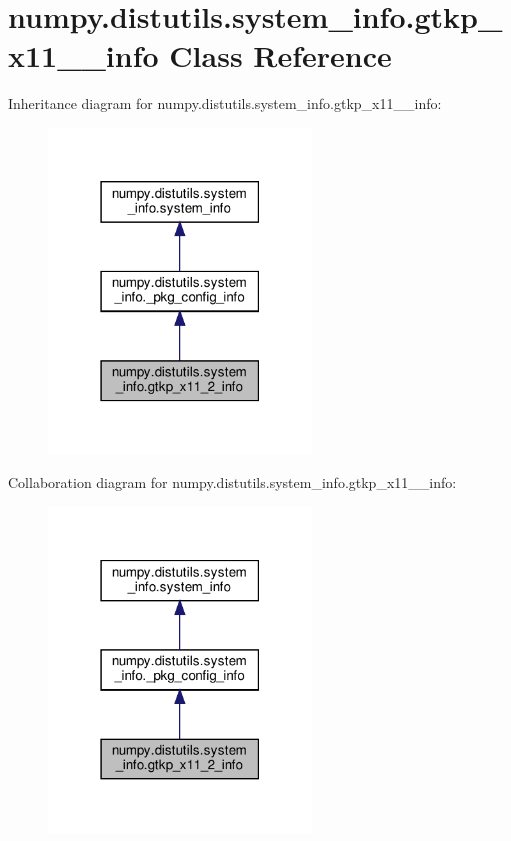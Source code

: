 \hypertarget{classnumpy_1_1distutils_1_1system__info_1_1gtkp__x11__2__info}{}\section{numpy.\+distutils.\+system\+\_\+info.\+gtkp\+\_\+x11\+\_\+\_\+info Class Reference}
\label{classnumpy_1_1distutils_1_1system__info_1_1gtkp__x11__2__info}


Inheritance diagram for numpy.\+distutils.\+system\+\_\+info.\+gtkp\+\_\+x11\+\_\+\_\+info\+:
\nopagebreak
\begin{figure}[H]
\begin{center}
\leavevmode
\includegraphics[width=198pt]{classnumpy_1_1distutils_1_1system__info_1_1gtkp__x11__2__info__inherit__graph}
\end{center}
\end{figure}


Collaboration diagram for numpy.\+distutils.\+system\+\_\+info.\+gtkp\+\_\+x11\+\_\+\_\+info\+:
\nopagebreak
\begin{figure}[H]
\begin{center}
\leavevmode
\includegraphics[width=198pt]{classnumpy_1_1distutils_1_1system__info_1_1gtkp__x11__2__info__coll__graph}
\end{center}
\end{figure}
